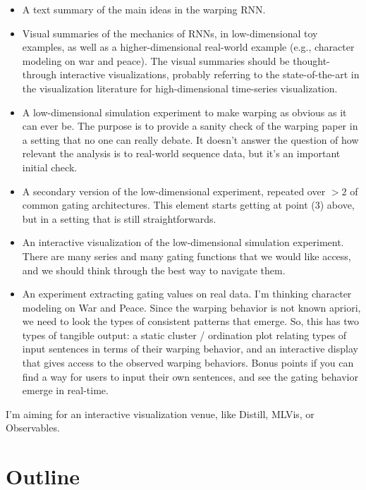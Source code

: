 \documentclass{article}
\begin{document}
\begin{itemize}
  \item A text summary of the main ideas in the warping RNN.
  \item Visual summaries of the mechanics of RNNs, in low-dimensional toy
    examples, as well as a higher-dimensional real-world example (e.g.,
    character modeling on war and peace). The visual summaries should be
    thought-through interactive visualizations, probably referring to the
    state-of-the-art in the visualization literature for high-dimensional
    time-series visualization.
  \item A low-dimensional simulation experiment to make warping as obvious as it
    can ever be. The purpose is to provide a sanity check of the warping paper
    in a setting that no one can really debate. It doesn't answer the question
    of how relevant the analysis is to real-world sequence data, but it's an
    important initial check.
  \item A secondary version of the low-dimensional experiment, repeated over $>
    2$ of common gating architectures. This element starts getting at point (3)
    above, but in a setting that is still straightforwards.
  \item An interactive visualization of the low-dimensional simulation
    experiment. There are many series and many gating functions that we would
    like access, and we should think through the best way to navigate them.
  \item An experiment extracting gating values on real data. I'm thinking
    character modeling on War and Peace. Since the warping behavior is not known
    apriori, we need to look the types of consistent patterns that emerge. So,
    this has two types of tangible output: a static cluster / ordination plot
    relating types of input sentences in terms of their warping behavior, and an
    interactive display that gives access to the observed warping behaviors.
    Bonus points if you can find a way for users to input their own sentences,
    and see the gating behavior emerge in real-time.
\end{itemize}

I'm aiming for an interactive visualization venue, like Distill, MLVis, or
Observables.

\section{Outline}
\label{sec:outline}
\end{document}
